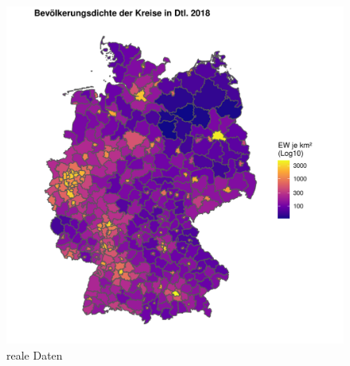 \begin{figure} %
    \centering %
    \begin{minipage}[b]{.45\linewidth} %
        \includegraphics[width=\linewidth,trim={2cm 1cm 1cm 1cm},clip]{body/figures/popdens2018.pdf} %
       \caption{reale Daten}
    \end{minipage} %
    \hfill
    \begin{minipage}[b]{.45\linewidth}

\end{minipage}
\end{figure}
